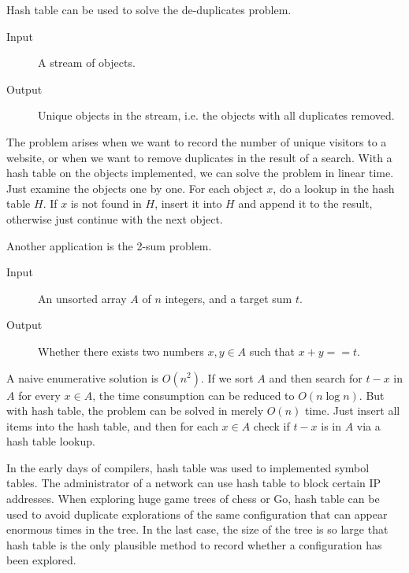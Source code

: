 Hash table can be used to solve the de-duplicates problem.
\begin{description}
\item[Input]A stream of objects.
\item[Output]Unique objects in the stream, i.e. the objects with all duplicates removed.
\end{description} 
The problem arises when we want to record the number of unique visitors to a website, or when we want to remove duplicates in the result of a search. With a hash table on the objects implemented, we can solve the problem in linear time. Just examine the objects one by one. For each object $x$, do a lookup in the hash table $H$. If $x$ is not found in $H$, insert it into $H$ and append it to the result, otherwise just continue with the next object.

Another application is the 2-sum problem.
\begin{description}
\item[Input]An unsorted array $A$ of $n$ integers, and a target sum $t$.
\item[Output]Whether there exists two numbers $x,y\in A$ such that $x+y==t$.
\end{description}
A naive enumerative solution is $O(n^2)$. If we sort $A$ and then search for $t-x$ in $A$ for every $x\in A$, the time consumption can be reduced to $O(n\log n)$. But with hash table, the problem can be solved in merely $O(n)$ time. Just insert all items into the hash table, and then for each $x\in A$ check if $t-x$ is in $A$ via a hash table lookup.

In the early days of compilers, hash table was used to implemented symbol tables. The administrator of a network can use hash table to block certain IP addresses. When exploring huge game trees of chess or Go, hash table can be used to avoid duplicate explorations of the same configuration that can appear enormous times in the tree. In the last case, the size of the tree is so large that hash table is the only plausible method to record whether a configuration has been explored.
